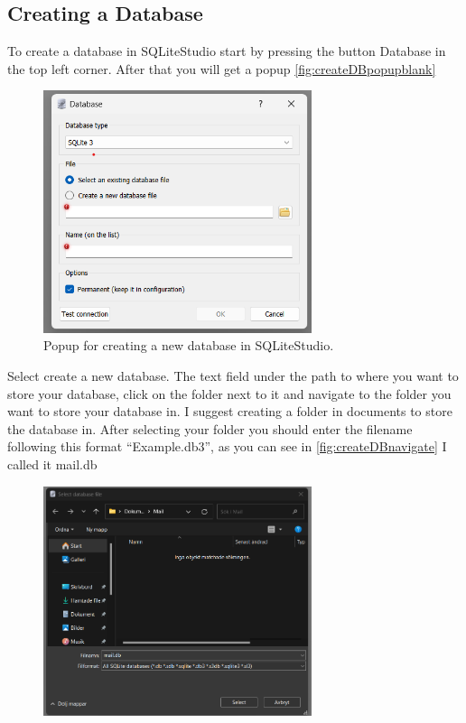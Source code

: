 \documentclass[a4paper,11pt,oneside]{article}
\begin{document}
\begin{sloppypar}
\subsection{Creating a Database}
\label{sqliteStudioCreatingDatabase}
To create a database in SQLiteStudio start by pressing the button Database in the top left corner. After that you will get a popup \autoref{fig:createDBpopupblank}
\begin{figure}[!htb]
  \centering
  \includegraphics[width=0.7\textwidth]{sqlitestudio/create_database/create_database_popup.png}
  \caption{Popup for creating a new database in SQLiteStudio.}
  \label{fig:createDBpopupblank}
\end{figure}
Select create a new database. The text field under the path to where you want to store your database, click on the folder next to it and navigate to the folder you want to store your database in. I suggest creating a folder in documents to store the database in. After selecting your folder you should enter the filename following this format ``Example.db3'', as you can see in \autoref{fig:createDBnavigate} I called it mail.db  
\begin{figure}[!htb]
  \centering
  \includegraphics[width=0.7\textwidth]{sqlitestudio/create_database/create_database_navigate.png}

\end{figure}
\end{sloppypar}
\end{document}
